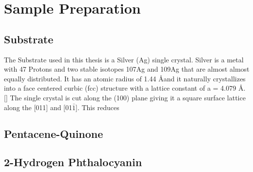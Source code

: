 \section{Sample Preparation}
\subsection{Substrate}
The Substrate used in this thesis is a Silver (Ag) single crystal.  
Silver is a metal with 47 Protons and two stable isotopes 107Ag and 109Ag that are almost almost equally distributed.
It has an atomic radius of 1.44 \AA and it naturally crystallizes into a face centered curbic (fcc) structure with a lattice constant of a = 4.079 \AA. [\cite{PhysRev.25.753}]
The single crystal is cut along the (100) plane giving it a square surface lattice along the [011] and [01$\bar{1}$].
This reduces 

\subsection{Pentacene-Quinone}


\subsection{2-Hydrogen Phthalocyanin}